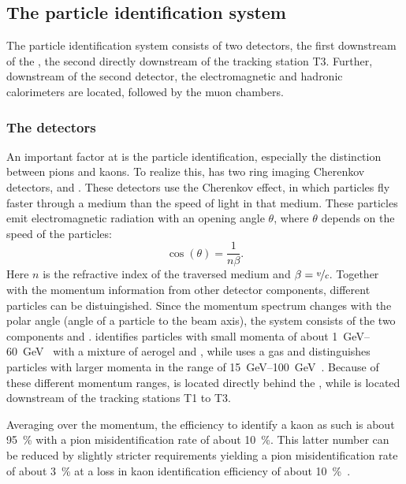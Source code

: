 \subsection{The particle identification system}
\label{sec:PartID}

The particle identification system consists of two \rich detectors, the first downstream of the \velo, the second directly downstream of the tracking station T3.
Further, downstream of the second \rich detector, the electromagnetic and hadronic calorimeters are located, followed by the muon chambers.

\subsubsection*{The \rich detectors}
\label{sec:rich}

An important factor at \lhcb is the particle identification, especially the distinction between pions and kaons.
To realize this, \lhcb has two ring imaging Cherenkov detectors, \richone and \richtwo.
These detectors use the Cherenkov effect, in which particles fly faster through a medium than the speed of light in that medium.
These particles emit electromagnetic radiation with an opening angle $\theta$, where $\theta$ depends on the speed of the particles:
\begin{equation}
\cos\!\left(\theta\right) = \frac{1}{n\beta}.
\end{equation}
Here $n$ is the refractive index of the traversed medium and $\beta = \nicefrac{v}{c}$.
Together with the momentum information from other detector components, different particles can be distuingished.
Since the momentum spectrum changes with the polar angle (angle of a particle to the beam axis), the \rich system consists of the two components \richone and \richtwo.
\richone identifies particles with small momenta of about \SIrange{1}{60}{\giga\electronvolt}~\cite{Alves:2008zz} with a mixture of aerogel and \cfourften, while \richtwo uses a \cffour gas and distinguishes particles with larger momenta in the range of \SIrange{15}{100}{\giga\electronvolt}~\cite{Alves:2008zz}. Because of these different momentum ranges, \richone is located directly behind the \velo, while \richtwo is located downstream of the tracking stations T1 to T3.

Averaging over the momentum, the efficiency to identify a kaon as such is about \SI{95}{\percent} with a pion misidentification rate of about \SI{10}{\percent}. This latter number can be reduced by slightly stricter requirements yielding a pion misidentification rate of about \SI{3}{\percent} at a loss in kaon identification efficiency of about \SI{10}{\percent}~\cite{Aaij:2014jba}.


